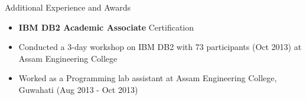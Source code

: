 \documentclass[]{mcdowellcv}
\begin{document}
	\begin{cvsection}{Additional Experience and Awards}
		\begin{cvsubsection}{}{}{}	
			\begin{itemize}
				\item \textbf{IBM DB2 Academic Associate} Certification
				\item Conducted a 3-day workshop on IBM DB2 with 73 participants (Oct 2013) at Assam Engineering College
				\item Worked as a Programming lab assistant at Assam Engineering College, Guwahati (Aug 2013 - Oct 2013)
			\end{itemize}
		\end{cvsubsection}
	\end{cvsection}
	
	
\end{document}
